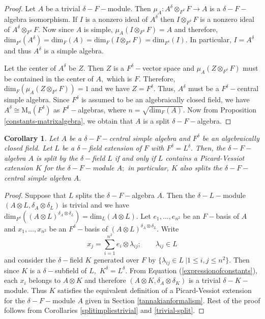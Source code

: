 \documentclass[preprint, 11pt]{amsart}
\theoremstyle{corollary}
\newtheorem{corollary}{Corollary}[theorem]
\theoremstyle{remark}
\theoremstyle{proposition}
\numberwithin{equation}{subsection}
\begin{document}
\begin{proof}
Let $A$ be a trivial $\delta-F-$module. Then   $\mu_A: A^{\delta}\otimes_{F^{\delta}}F\to A$ is a $\delta-F-$algebra isomorphism. If $I$ is a nonzero ideal of $A^{\delta}$ then $I\otimes_{F^{\delta}}F$ is a nonzero ideal of $A^{\delta}\otimes_{F^{\delta}}F.$  Now since $A$ is simple, $\mu_A(I\otimes_{F^{\delta}}F)=A$ and therefore, $\mathrm{dim}_{F^{\delta}}(A^{\delta})=\mathrm{dim}_F(A)=\mathrm{dim}_F(I\otimes_{F^{\delta}}F) =\mathrm{dim}_{F^{\delta}}(I).$ In particular, $I=A^{\delta}$ and thus $A^{\delta}$ is a simple algebra. 

Let the center of $A^{\delta}$ be $Z.$ Then $Z$ is a $F^{\delta}-$vector space and $\mu_A(Z\otimes_{F^{\delta}}F)$ must be contained in the  center of $A,$ which is $F.$ Therefore, $\mathrm{dim}_F(\mu_A(Z\otimes_{F^{\delta}}F))=1$ and we have $Z=F^{\delta}.$	Thus, $A^{\delta}$ must be a $F^{\delta}-$central simple algebra. Since $F^{\delta}$ is assumed to be an algebraically closed field, we have $A^{\delta}\cong \mathrm{M}_n(F^{\delta})$ as $F^{\delta}-$algebras, where $n=\sqrt{\mathrm{dim}_F(A)}$. Now from Proposition \ref{constants-matrixalgebra}, we obtain that $A$ is a split $\delta-F-$algebra.\end{proof}


\begin{corollary}\label{trivial-split-PV} Let $A$ be a $\delta-F-$central simple algebra  and  $F^{\delta}$ be an algebraically closed field. Let $L$ be a $\delta-$field extension of $F$ with $F^{\delta}=L^\delta.$   Then, the $\delta-F-$ algebra  $A$ is split by the $\delta-$field $L$  if and only if $L$ contains a Picard-Vessiot extension $K$ for the $\delta-F-$module $A;$ in particular, $K$ also splits the $\delta-F-$central simple algebra $A.$ 
\end{corollary}

\begin{proof} Suppose that $L$ splits the $\delta-F-$algebra $A.$ Then the $\delta-L-$module $(A\otimes L, \delta_A\otimes\delta_L)$ is trivial and we have $\mathrm{dim}_{F^\delta}((A\otimes L)^{\delta_A \otimes \delta_L})=\mathrm{dim}_L(A\otimes L).$ Let $e_1,\dots, e_{n^2}$ be an $F-$basis of $A$ and $x_1,\dots, x_{n^2}$ be an $F^{\delta}-$basis of $(A\otimes L)^{\delta_A\otimes \delta_L}.$ Write \begin{equation}\label{expressionofconstants}x_j=\sum^{n^2}_{i=1}e_i\otimes\lambda_{ij}; \qquad \lambda_{ij}\in L\end{equation} 
	and consider the $\delta-$field $K$ generated over $F$ by $\{\lambda_{ij}\in L\ | 1\leq i, j\leq n^2 \}.$  Then since $K$ is a $\delta-$subfield of $L,$ $K^\delta=L^\delta.$ From Equation (\ref{expressionofconstants}), each $x_i$ belongs to $A\otimes K$ and therefore  $(A\otimes K, \delta_A\otimes \delta_K)$ is  a trivial $\delta-K-$module. Thus $K$ satisfies the equivalent definition of a Picard-Vessiot extension for the $\delta-F-$module $A$ given in  Section \ref{tannakianformalism}. Rest of the proof follows from Corollaries \ref{splitimpliestrivial} and \ref{trivial-split}.
\end{proof}
\end{document}
